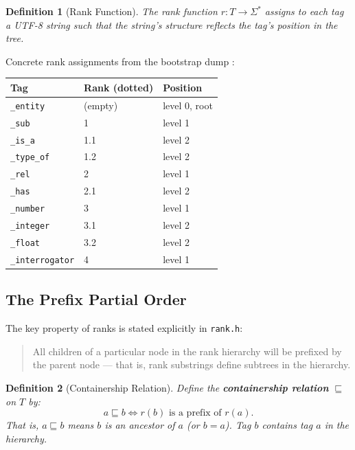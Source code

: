 \documentclass{article}
\newtheorem{definition}{Definition}[section]
\begin{document}
\begin{definition}[Rank Function]
The rank function $r : T \to \Sigma^*$ assigns to each tag a UTF-8 string
such that the string's structure reflects the tag's position in the tree.
\end{definition}

Concrete rank assignments from the bootstrap dump \cite{bootstrap}:

\begin{center}
\begin{tabular}{lll}
\toprule
\textbf{Tag} & \textbf{Rank (dotted)} & \textbf{Position} \\
\midrule
\texttt{\_entity}       & (empty)  & level 0, root \\
\texttt{\_sub}          & 1        & level 1 \\
\texttt{\_is\_a}        & 1.1      & level 2 \\
\texttt{\_type\_of}     & 1.2      & level 2 \\
\texttt{\_rel}          & 2        & level 1 \\
\texttt{\_has}          & 2.1      & level 2 \\
\texttt{\_number}       & 3        & level 1 \\
\texttt{\_integer}      & 3.1      & level 2 \\
\texttt{\_float}        & 3.2      & level 2 \\
\texttt{\_interrogator} & 4        & level 1 \\
\bottomrule
\end{tabular}
\end{center}

\subsection{The Prefix Partial Order}

The key property of ranks is stated explicitly in \texttt{rank.h}:
\begin{quote}
All children of a particular node in the rank hierarchy will be prefixed by the
parent node --- that is, rank substrings define subtrees in the hierarchy.
\end{quote}

\begin{definition}[Containership Relation]
Define the \textbf{containership relation} $\sqsubseteq$ on $T$ by:
\[
  a \sqsubseteq b
  \iff
  r(b) \text{ is a prefix of } r(a).
\]
That is, $a \sqsubseteq b$ means $b$ is an ancestor of $a$ (or $b = a$). Tag
$b$ \emph{contains} tag $a$ in the hierarchy.
\end{definition}
\end{document}
